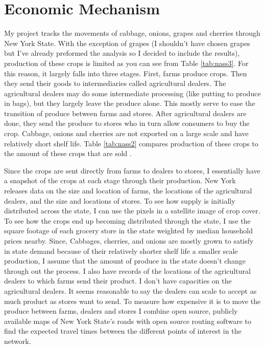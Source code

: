 \documentclass{report}
\begin{document}
\section{Economic Mechanism}

My project tracks the movements of cabbage, onions, grapes and cherries through New York State. With the exception of grapes (I shouldn't have chosen grapes but I've already preformed the analysis so I decided to include the results), production of these crops is limited as you can see from Table \ref{tab:nass3}. For this reason, it largely falls into three stages. First, farms produce crops. Then they send their goods to intermediaries called agricultural dealers. The agricultural dealers may do some intermediate processing (like putting to produce in bags), but they largely leave the produce alone. This mostly serve to ease the transition of produce between farms and stores. After agricultural dealers are done, they send the produce to stores who in turn allow consumers to buy the crop. Cabbage, onions and cherries are not exported on a large scale and have relatively short shelf life. Table \ref{tab:nass2} compares production of these crops to the amount of these crops that are sold \cite{nass2}.  

Since the crops are sent directly from farms to dealers to stores, I essentially have a snapshot of the crops at each stage through their production. New York releases data on the size and location of farms, the locations of the agricultural dealers, and the size and locations of stores. To see how supply is initially distributed across the state, I can use the pixels in a satellite image of crop cover. To see how the crops end up becoming distributed through the state, I use the square footage of each grocery store in the state weighted by median household prices nearby.  Since, Cabbages, cherries, and onions are mostly grown to satisfy in state demand because of their relatively shorter shelf life a smaller scale production, I assume that the amount of produce in the state doesn't change through out the process. I also have records of the locations of the agricultural dealers to which farms send their product. I don't have capacities on the agricultural dealers. It seems reasonable to say the dealers can scale to accept as much product as stores want to send. To measure how expensive it is to move the produce between farms, dealers and stores I combine open source, publicly available maps of New York State's roads with open source routing software to find the expected travel times between the different points of interest in the network.  
\end{document}
